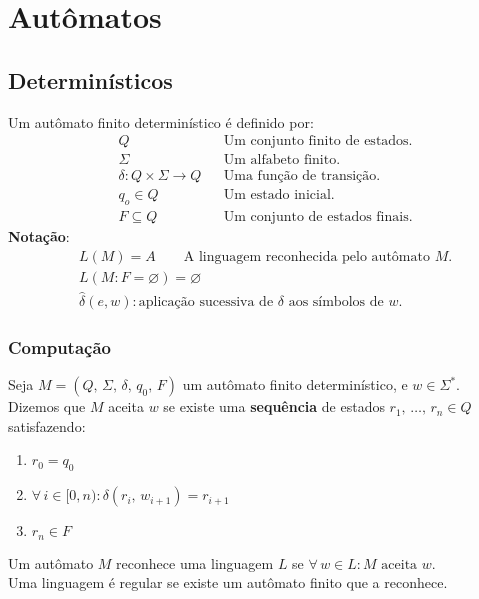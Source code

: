\documentclass[11pt]{article}
\begin{document}
\section{Autômatos}
\label{sec:org5607de7}
\subsection{Determinísticos}
\label{sec:org9bef582}
Um autômato finito determinístico é definido por:
\begin{align*}
  & Q && \text{Um conjunto finito de estados.} \\
  & \Sigma && \text{Um alfabeto finito.} \\
  & \delta: Q \times \Sigma \to Q && \text{Uma função de transição.} \\
  & q_o \in Q && \text{Um estado inicial.} \\
  & F \subseteq Q && \text{Um conjunto de estados finais.}
\end{align*}
\textbf{Notação}:
\begin{align*}
  & L(M) = A \qquad \text{A linguagem reconhecida pelo autômato $M$.} \\[5pt]
  & L(M: F = \varnothing) = \varnothing \\[5pt]
  & \hat{\delta}(e, w): \text{aplicação sucessiva de }\delta\text{ aos símbolos de }w.
\end{align*}
\subsubsection{Computação}
\label{sec:org568e774}
Seja \(M = (Q,\, \Sigma,\, \delta,\, q_0,\, F)\) um autômato finito determinístico, e \(w
    \in \Sigma^*\). \\
Dizemos que \(M\) aceita \(w\) se existe uma \textbf{sequência} de estados
\(r_1, \,\hdots,\, r_n \in Q\) satisfazendo:
\begin{enumerate}
\item \(r_0 = q_0\)
\item \(\forall\, i \in [0, n): \delta(r_i,\, w_{i + 1}) = r_{i + 1}\)
\item \(r_n \in F\)
\end{enumerate}
Um autômato \(M\) reconhece uma linguagem \(L\) se \(\forall\, w \in L: M \text{ aceita } w\). \\
Uma linguagem é regular se existe um autômato finito que a reconhece.
\end{document}

